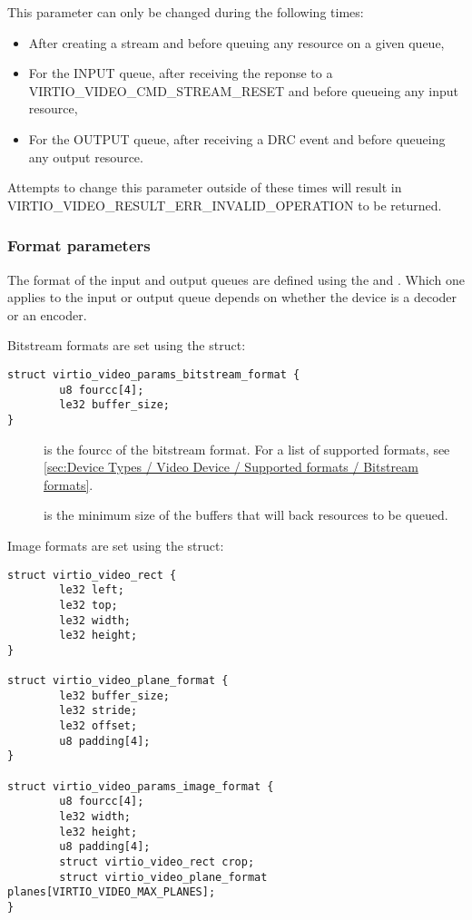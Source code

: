 This parameter can only be changed during the following times:

\begin{itemize}
\item
  After creating a stream and before queuing any resource on a given
  queue,
\item
  For the INPUT queue, after receiving the reponse to a
  VIRTIO\_VIDEO\_CMD\_STREAM\_RESET and before queueing any input
  resource,
\item
  For the OUTPUT queue, after receiving a DRC event and before queueing
  any output resource.
\end{itemize}

Attempts to change this parameter outside of these times will result in
VIRTIO\_VIDEO\_RESULT\_ERR\_INVALID\_OPERATION to be returned.

\subsubsection{Format parameters}\label{sec:Device Types / Video Device / Parameters / Format parameters}

The format of the input and output queues are defined using the
 and
. Which one applies to the input
or output queue depends on whether the device is a decoder or an
encoder.

Bitstream formats are set using the
 struct:

\begin{lstlisting}
struct virtio_video_params_bitstream_format {
        u8 fourcc[4];
        le32 buffer_size;
}
\end{lstlisting}

\begin{description}
\item[]
is the fourcc of the bitstream format. For a list of supported formats,
see
\ref{sec:Device Types / Video Device / Supported formats / Bitstream formats}.
\item[]
is the minimum size of the buffers that will back resources to be
queued.
\end{description}

Image formats are set using the 
struct:

\begin{lstlisting}
struct virtio_video_rect {
        le32 left;
        le32 top;
        le32 width;
        le32 height;
}

struct virtio_video_plane_format {
        le32 buffer_size;
        le32 stride;
        le32 offset;
        u8 padding[4];
}

struct virtio_video_params_image_format {
        u8 fourcc[4];
        le32 width;
        le32 height;
        u8 padding[4];
        struct virtio_video_rect crop;
        struct virtio_video_plane_format planes[VIRTIO_VIDEO_MAX_PLANES];
}
\end{lstlisting}

